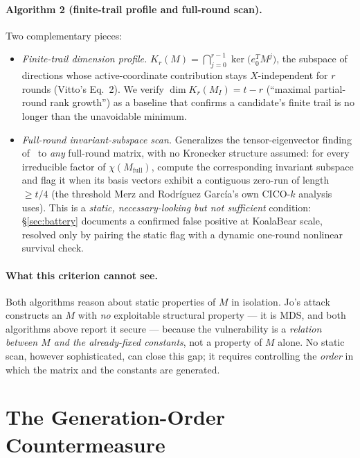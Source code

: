 \documentclass[11pt]{article}
\newcommand{\MI}{M_{I}}
\newcommand{\Mfull}{M_{\mathrm{full}}}
\begin{document}
\paragraph{Algorithm 2 (finite-trail profile and full-round scan).}
Two complementary pieces:
\begin{itemize}[leftmargin=1.4em]
  \item \emph{Finite-trail dimension profile.} $K_r(M) =
  \bigcap_{j=0}^{r-1}\ker\!\big(e_0^{T}M^{j}\big)$, the subspace of
  directions whose active-coordinate contribution stays $X$-independent
  for $r$ rounds (Vitto's Eq.~2). We verify $\dim K_r(\MI) = t - r$
  (``maximal partial-round rank growth'') as a baseline that confirms a
  candidate's finite trail is no longer than the unavoidable minimum.
  \item \emph{Full-round invariant-subspace scan.} Generalizes the
  tensor-eigenvector finding of~\cite{merzgarcia2026} to \emph{any} full-round
  matrix, with no Kronecker structure assumed: for every irreducible
  factor of $\chi(\Mfull)$, compute the corresponding invariant subspace
  and flag it when its basis vectors exhibit a contiguous zero-run of
  length $\geq t/4$ (the threshold Merz and Rodr\'iguez Garc\'ia's own
  CICO-$k$ analysis uses). This is a \emph{static, necessary-looking but
  not sufficient} condition: \S\ref{sec:battery} documents a confirmed
  false positive at KoalaBear scale, resolved only by pairing the static
  flag with a dynamic one-round nonlinear survival check.
\end{itemize}

\paragraph{What this criterion cannot see.} Both algorithms reason about
static properties of $M$ in isolation. Jo's attack constructs an $M$ with
\emph{no} exploitable structural property --- it is MDS, and both
algorithms above report it secure --- because the vulnerability is a
\emph{relation between $M$ and the already-fixed constants}, not a
property of $M$ alone. No static scan, however sophisticated, can close
this gap; it requires controlling the \emph{order} in which the matrix and
the constants are generated.

\section{The Generation-Order Countermeasure}
\label{sec:binding}
\end{document}
